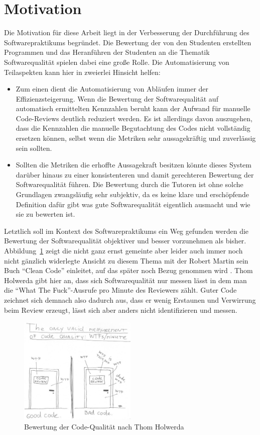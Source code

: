 \documentclass[da,ngerman]{stthesis}
\begin{document}
  		\section{Motivation}
  			Die Motivation für diese Arbeit liegt in der Verbesserung der Durchführung des Softwarepraktikums begründet. Die Bewertung der von den Studenten erstellten Programmen und das Heranführen der Studenten an die Thematik Softwarequalität spielen dabei eine große Rolle. Die Automatisierung von Teilaspekten kann hier in zweierlei Hinsicht helfen:
  			\begin{itemize}
  				\item Zum einen dient die Automatisierung von Abläufen immer der Effizienzsteigerung. Wenn die Bewertung der Softwarequalität auf automatisch ermittelten Kennzahlen beruht kann der Aufwand für manuelle Code-Reviews deutlich reduziert werden. Es ist allerdings davon auszugehen, dass die Kennzahlen die manuelle Begutachtung des Codes nicht vollständig ersetzen können, selbst wenn die Metriken sehr aussagekräftig und zuverlässig sein sollten.
  				\item Sollten die Metriken die erhoffte Aussagekraft besitzen könnte dieses System darüber hinaus zu einer konsistenteren und damit gerechteren Bewertung der Softwarequalität führen. Die Bewertung durch die Tutoren ist ohne solche Grundlagen zwangsläufig sehr subjektiv, da es keine klare und erschöpfende Definition dafür gibt was gute Softwarequalität eigentlich ausmacht und wie sie zu bewerten ist.
  			\end{itemize}
  			Letztlich soll im Kontext des Softwarepraktikums ein Weg gefunden werden die Bewertung der Softwarequalität objektiver und besser vorzunehmen als bisher. Abbildung~\ref{wtfsm} zeigt die nicht ganz ernst gemeinte aber leider auch immer noch nicht gänzlich widerlegte Ansicht zu diesem Thema mit der Robert Martin sein Buch "`Clean Code"' einleitet, auf das später noch Bezug genommen wird \cite{CleanCode}. Thom Holwerda gibt hier an, dass sich Softwarequalität nur messen lässt in dem man die "`What The Fuck"'-Ausrufe pro Minute des Reviewers zählt. Guter Code zeichnet sich demnach also dadurch aus, dass er wenig Erstaunen und Verwirrung beim Review erzeugt, lässt sich aber anders nicht identifizieren und messen.  
  			\begin{figure} [h]
				\centering
				\includegraphics [width=0.5\textwidth] {wtfsm.png}
				\caption{Bewertung der Code-Qualität nach Thom Holwerda \cite{WTFsm}}
				\label{wtfsm}
			\end{figure}
\end{document}
